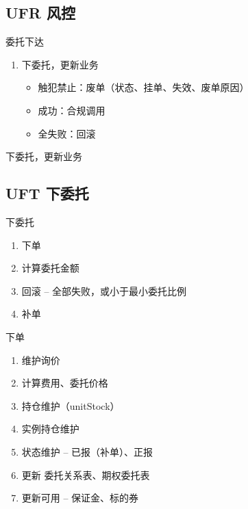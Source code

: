 \documentclass[12pt]{ctexbeamer}	%
\begin{document}

\subsection{UFR 风控}

\begin{frame}{委托下达}
  \begin{enumerate}
    \item 下委托，更新业务
    \begin{itemize}
      \item 触犯禁止：废单（状态、挂单、失效、废单原因）
      \item 成功：合规调用
      \item 全失败：回滚
    \end{itemize}
  \end{enumerate}
\end{frame}

\begin{frame}{下委托，更新业务}

\end{frame}


\subsection{UFT 下委托}

\begin{frame}{下委托}
  \begin{enumerate}
    \item 下单
    \item 计算委托金额
    \item 回滚 -- 全部失败，或小于最小委托比例
    \item 补单
  \end{enumerate}
\end{frame}

\begin{frame}{下单}
  \begin{enumerate}
    \item 维护询价
    \item 计算费用、委托价格
    \item 持仓维护（unitStock）
    \item 实例持仓维护
    \item 状态维护 -- 已报（补单）、正报
    \item 更新 委托关系表、期权委托表
    \item 更新可用 -- 保证金、标的券
  \end{enumerate}
\end{frame}
\end{document}
